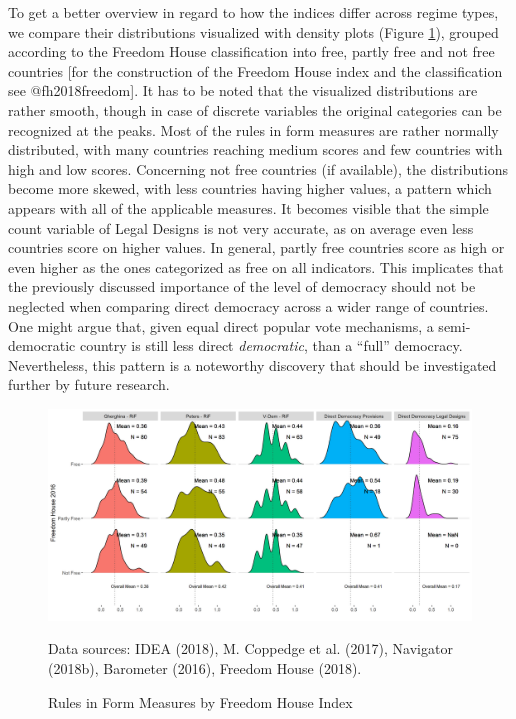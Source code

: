 \documentclass[]{article}
\begin{document}
To get a better overview in regard to how the indices differ across
regime types, we compare their distributions visualized with density
plots (Figure \ref{rif_fh}), grouped according to the Freedom House
classification into free, partly free and not free countries {[}for the
construction of the Freedom House index and the classification see
@fh2018freedom{]}. It has to be noted that the visualized distributions
are rather smooth, though in case of discrete variables the original
categories can be recognized at the peaks. Most of the rules in form
measures are rather normally distributed, with many countries reaching
medium scores and few countries with high and low scores. Concerning not
free countries (if available), the distributions become more skewed,
with less countries having higher values, a pattern which appears with
all of the applicable measures. It becomes visible that the simple count
variable of Legal Designs is not very accurate, as on average even less
countries score on higher values. In general, partly free countries
score as high or even higher as the ones categorized as free on all
indicators. This implicates that the previously discussed importance of
the level of democracy should not be neglected when comparing direct
democracy across a wider range of countries. One might argue that, given
equal direct popular vote mechanisms, a semi-democratic country is still
less direct \emph{democratic}, than a ``full'' democracy. Nevertheless,
this pattern is a noteworthy discovery that should be investigated
further by future research.

\begin{figure}[!bh]
    \caption{Rules in Form Measures by Freedom House Index}
    \label{rif_fh}
    \includegraphics[width=\textwidth]{images/coef_rif2.png}
    \flushright
    {\scriptsize Data sources: IDEA (2018), M. Coppedge et al. (2017), Navigator (2018b), Barometer (2016), Freedom House (2018). \par}
\end{figure}
\end{document}
